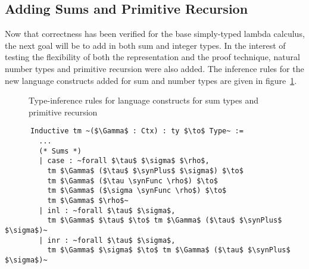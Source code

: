 \subsection{Adding Sums and Primitive Recursion}
  Now that correctness has been verified for the base simply-typed lambda calculus, the next goal will be to add in both sum and integer types.
  In the interest of testing the flexibility of both the representation and the proof technique, natural number types and primitive recursion were also added.
  The inference rules for the new language constructs added for sum and number types are given in figure~\ref{fig:sum_prim_infer}.

  \begin{figure}
    \caption{Type-inference rules for language constructs for sum types and primitive recursion}
    \label{fig:sum_prim_infer}
  \end{figure}

  \begin{listing}
    \begin{verbatim}
      Inductive tm ~($\Gamma$ : Ctx) : ty $\to$ Type~ :=
        ...
        (* Sums *)
        | case : ~forall $\tau$ $\sigma$ $\rho$,
          tm $\Gamma$ ($\tau$ $\synPlus$ $\sigma$) $\to$
          tm $\Gamma$ ($\tau \synFunc \rho$) $\to$
          tm $\Gamma$ ($\sigma \synFunc \rho$) $\to$
          tm $\Gamma$ $\rho$~
        | inl : ~forall $\tau$ $\sigma$,
          tm $\Gamma$ $\tau$ $\to$ tm $\Gamma$ ($\tau$ $\synPlus$ $\sigma$)~
        | inr : ~forall $\tau$ $\sigma$,
          tm $\Gamma$ $\sigma$ $\to$ tm $\Gamma$ ($\tau$ $\synPlus$ $\sigma$)~
    \end{verbatim}
    \caption{Terms in our language related to sum types.}
    \label{lst:stlc_sums}
  \end{listing}

